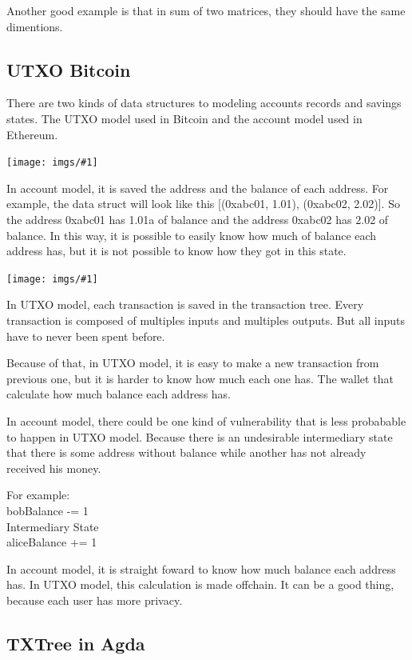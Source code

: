 \documentclass[12pt]{article}
\newcommand{\agda}[2]{\ExecuteMetaData[latex/#1.tex]{#2}}
\newcommand{\incimg}[1]{\texttt{[image: imgs/\#1]}}
\begin{document}
Another good example is that in sum of two matrices, they should have the same dimentions.

\agda{agdaExamples}{matrixSum}

\subsection{UTXO Bitcoin}

There are two kinds of data structures to modeling accounts records and savings states.
The UTXO model used in Bitcoin and the account model used in Ethereum.

  \incimg{account.jpeg}

In account model, it is saved the address and the balance of each address.
For example, the data struct will look like this [(0xabc01, 1.01), (0xabc02, 2.02)].
So the address 0xabc01 has 1.01a of balance and the address 0xabc02 has 2.02 of balance.
In this way, it is possible to easily know how much of balance each address has,
but it is not possible to know how they got in this state.

  \incimg{utxo.png}

In UTXO model, each transaction is saved in the transaction tree.
Every transaction is composed of multiples inputs and multiples outputs.
But all inputs have to never been spent before.

Because of that, in UTXO model, it is easy to make a new transaction from previous one, but it is harder to know how much each one has.
The wallet that calculate how much balance each address has.

In account model, there could be one kind of vulnerability that is less probabable to happen in UTXO model.
Because there is an undesirable intermediary state that there is some address without balance while another has not already received his money.

For example: \\
bobBalance -= 1 \\
Intermediary State \\
aliceBalance += 1

In account model, it is straight foward to know how much balance each address has.
In UTXO model, this calculation is made offchain. It can be a good thing,
because each user has more privacy.

\subsection{TXTree in Agda}
\end{document}
